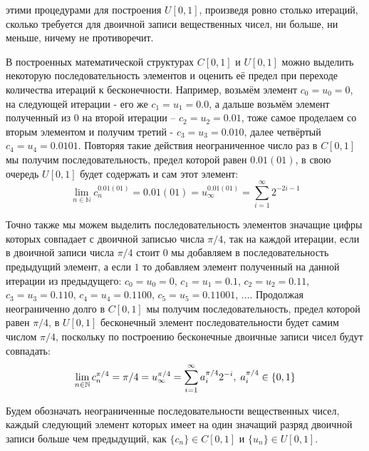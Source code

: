 \documentclass[12pt]{article}
\begin{document}
этими процедурами для построения $U[0, 1]$, произведя ровно столько итераций, сколько требуется для двоичной записи вещественных чисел, ни больше, ни меньше, ничему не противоречит. 

В построенных математической структурах $C[0, 1]$ и $U[0, 1]$ можно выделить некоторую последовательность элементов и оценить её предел при переходе количества итераций к бесконечности. Например, возьмём элемент $c_0 = u_0 = 0$, на следующей итерации - его же $c_1 = u_1 = 0.0$, а дальше возьмём элемент полученный из $0$ на второй итерации – $c_2 = u_2 = 0.01$, тоже самое проделаем со вторым элементом и получим третий - $c_3 = u_3 = 0.010$, далее четвёртый $c_4 = u_4 = 0.0101$. Повторяя такие действия неограниченное число раз в $C[0, 1]$ мы получим последовательность, предел которой равен $0.01(01)$, в свою очередь $U[0, 1]$ будет содержать и сам этот элемент:
\begin{equation}
\lim_{n \in \mathbb{N}} c^{0.01(01)}_n = 0.01(01) = u^{0.01(01)}_\infty = \sum_{i=1}^{\infty} 2^{-2i-1}
\end{equation}

Точно также мы можем выделить последовательность элементов значащие цифры которых совпадает с двоичной записью числа $\pi/4$, так на каждой итерации, если в двоичной записи числа $\pi/4$ стоит $0$ мы добавляем в последовательность предыдущий элемент, а если $1$ то добавляем элемент полученный на данной итерации из предыдущего: $c_0 = u_0 = 0$, $c_1 = u_1 = 0.1$, $c_2 = u_2 = 0.11$, $c_3 = u_3 = 0.110$, $c_4 = u_4 = 0.1100$, $c_5 = u_5 = 0.11001$, $\dots$. Продолжая неограниченно долго в $C[0, 1]$ мы получим последовательность, предел которой равен $\pi/4$, в $U[0, 1]$ бесконечный элемент последовательности будет самим числом $\pi/4$, поскольку по построению бесконечные двоичные записи чисел будут совпадать:
\begin{equation}
\lim_{n \in \mathbb{N}} c^{\pi/4}_n = \pi/4 = u^{\pi/4}_\infty = \sum_{i=1}^{\infty} a_i^{\pi/4}2^{-i},\thickspace a_i^{\pi/4} \in \{0, 1\}
\end{equation}

Будем обозначать неограниченные последовательности вещественных чисел, каждый следующий элемент которых имеет на один значащий разряд двоичной записи больше чем предыдущий, как $\{c_n\} \in C[0, 1]$ и $\{u_n\} \in U[0, 1]$.
\end{document}
